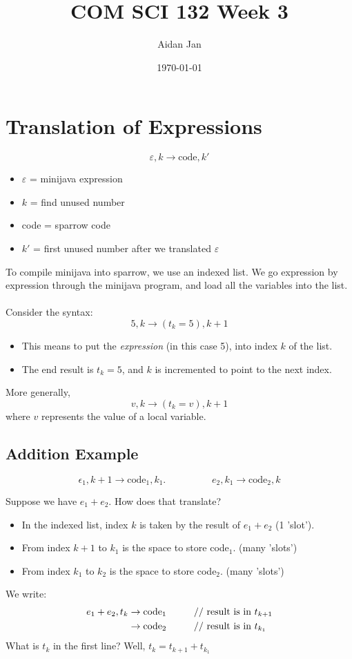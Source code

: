 \documentclass[10pt]{article}
\title{COM SCI 132 Week 3}
\author{Aidan Jan}
\date{\today}
\begin{document}
\maketitle
\section*{Translation of Expressions}
\[\varepsilon, k \rightarrow \text{code}, k'\]
\begin{itemize}
    \item $\varepsilon$ = minijava expression
    \item $k$ = find unused number
    \item code = sparrow code
    \item $k'$ = first unused number after we translated $\varepsilon$
\end{itemize}
To compile minijava into sparrow, we use an indexed list.  We go expression by expression through the minijava program, and load all the variables into the list.\\\\
Consider the syntax:
\[5, k \rightarrow (t_k = 5), k + 1\]
\begin{itemize}
    \item This means to put the \textit{expression} (in this case 5), into index $k$ of the list.
    \item The end result is $t_k = 5$, and $k$ is incremented to point to the next index.
\end{itemize}
More generally,
\[v, k \rightarrow (t_k = v), k + 1\]
where $v$ represents the value of a local variable.

\subsection*{Addition Example}
\[\epsilon_1, k + 1 \rightarrow \text{code}_1, k_1.\hspace{2cm} e_2, k_1 \rightarrow \text{code}_2, k\]

Suppose we have $e_1 + e_2$.  How does that translate?
\begin{itemize}
    \item In the indexed list, index $k$ is taken by the result of $e_1 + e_2$ (1 'slot').
    \item From index $k + 1$ to $k_1$ is the space to store code$_1$. (many 'slots')
    \item From index $k_1$ to $k_2$ is the space to store code$_2$.  (many 'slots')
\end{itemize}
We write:
\begin{align*}
e_1 + e_2, t_k &\rightarrow \text{code}_1 \text{\hspace{1cm}// result is in $t_{k + 1}$}\\
&\rightarrow \text{code}_2 \text{\hspace{1cm}// result is in $t_{k_1}$}
\end{align*}
What is $t_k$ in the first line?  Well, $t_k = t_{k + 1} + t_{k_1}$
\end{document}
